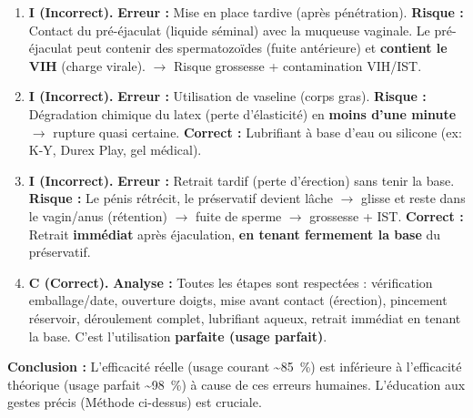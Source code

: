 \documentclass[11pt]{article}
\begin{document}
\begin{exoresolu}
\begin{enumerate}
        \item \textbf{I (Incorrect).} \textbf{Erreur :} Mise en place tardive (après pénétration). \textbf{Risque :} Contact du pré-éjaculat (liquide séminal) avec la muqueuse vaginale. Le pré-éjaculat peut contenir des spermatozoïdes (fuite antérieure) et \textbf{contient le VIH} (charge virale). $\rightarrow$ Risque grossesse + contamination VIH/IST.
        \item \textbf{I (Incorrect).} \textbf{Erreur :} Utilisation de vaseline (corps gras). \textbf{Risque :} Dégradation chimique du latex (perte d'élasticité) en \textbf{moins d'une minute} $\rightarrow$ rupture quasi certaine. \textbf{Correct :} Lubrifiant à base d'eau ou silicone (ex: K-Y, Durex Play, gel médical).
        \item \textbf{I (Incorrect).} \textbf{Erreur :} Retrait tardif (perte d'érection) sans tenir la base. \textbf{Risque :} Le pénis rétrécit, le préservatif devient lâche $\rightarrow$ glisse et reste dans le vagin/anus (rétention) $\rightarrow$ fuite de sperme $\rightarrow$ grossesse + IST. \textbf{Correct :} Retrait \textbf{immédiat} après éjaculation, \textbf{en tenant fermement la base} du préservatif.
        \item \textbf{C (Correct).} \textbf{Analyse :} Toutes les étapes sont respectées : vérification emballage/date, ouverture doigts, mise avant contact (érection), pincement réservoir, déroulement complet, lubrifiant aqueux, retrait immédiat en tenant la base. C'est l'utilisation \textbf{parfaite (usage parfait)}.
    \end{enumerate}
    \textbf{Conclusion :} L'efficacité réelle (usage courant \textasciitilde \SI{85}{\percent}) est inférieure à l'efficacité théorique (usage parfait \textasciitilde \SI{98}{\percent}) à cause de ces erreurs humaines. L'éducation aux gestes précis (Méthode ci-dessus) est cruciale.
\end{exoresolu}
\end{document}
